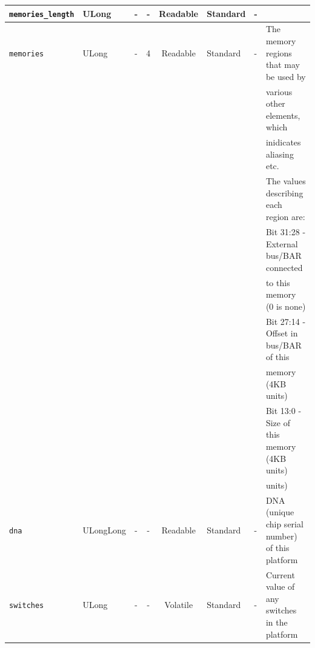 \documentclass{article}
\begin{document}
\begin{landscape}
\begin{scriptsize}
\begin{tabular}{|p{3cm}|p{1.5cm}|c|c|c|p{1.5cm}|p{1cm}|p{6cm}|}
			\verb+memories_length+ & ULong & -           & -               & Readable           & Standard    & -       &                                                                               \\
			\hline
			\verb+memories+    & ULong  & -              & 4               & Readable           & Standard    & -       & The memory regions that may be used by \\
  	                     &        &                &                 &                    &             &         & various other elements, which          \\
  	                     &        &                &                 &                    &             &         & inidicates aliasing etc.               \\
                         &        &                &                 &                    &             &         & The values describing each region are: \\
                         &        &                &                 &                    &             &         & Bit 31:28 - External bus/BAR connected \\
                         &        &                &                 &                    &             &         &             to this memory (0 is none) \\
                         &        &                &                 &                    &             &         & Bit 27:14 - Offset in bus/BAR of this  \\
                         &        &                &                 &                    &             &         &             memory (4KB units)         \\
                         &        &                &                 &                    &             &         & Bit  13:0 - Size of this memory (4KB units) \\
                         &        &                &                 &                    &             &         &             units) \\
			\hline
			\verb+dna+         & ULongLong & -           & -               & Readable           & Standard    & -       & DNA (unique chip serial number) of this platform \\
			\hline
			\verb+switches+    & ULong  & -              & -               & Volatile           & Standard    & -       & Current value of any switches in the platform                                 \\

\end{tabular}
\end{scriptsize}
\end{landscape}
\end{document}
